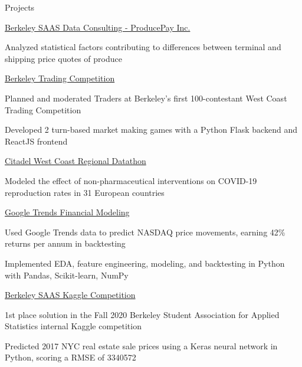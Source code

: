 \documentclass{resume} %
\begin{document}

\begin{rSection}{Projects}

\begin{rSubsection}{\href{https://www.producepay.com/}{Berkeley SAAS Data Consulting - ProducePay Inc.}}{}{}{}
    \item Analyzed statistical factors contributing to differences between terminal and shipping price quotes of produce
\end{rSubsection}

\begin{rSubsection}{\href{https://traders.berkeley.edu/}{Berkeley Trading Competition}}{}{}{}
    \item Planned and moderated Traders at Berkeley's first 100-contestant West Coast Trading Competition
    \item Developed 2 turn-based market making games with a Python Flask backend and ReactJS frontend 
\end{rSubsection}

\begin{rSubsection}{\href{https://github.com/evilpegasus/datathon-spring-2021}{Citadel West Coast Regional Datathon}}{}{}{}
    \item Modeled the effect of non-pharmaceutical interventions on COVID-19 reproduction rates in 31 European countries
\end{rSubsection}

\begin{rSubsection}{\href{https://github.com/evilpegasus/google-trends-financial-modeling/}{Google Trends Financial Modeling}}{}{}{}
    \item Used Google Trends data to predict NASDAQ price movements, earning 42\% returns per annum in backtesting
    \item Implemented EDA, feature engineering, modeling, and backtesting in Python with Pandas, Scikit-learn, NumPy
\end{rSubsection}

\begin{rSubsection}{\href{https://www.kaggle.com/c/saas-2020-fall-cx-kaggle-compeition/}{Berkeley SAAS Kaggle Competition}}{}{}{}
    \item 1st place solution in the Fall 2020 Berkeley Student Association for Applied Statistics internal Kaggle competition
    \item Predicted 2017 NYC real estate sale prices using a Keras neural network in Python, scoring a RMSE of 3340572
\end{rSubsection}


\end{rSection}
\end{document}
